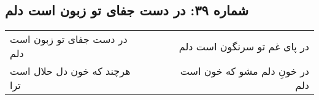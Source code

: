 \begin{center}
\section*{شماره ۳۹: در دست جفای تو زبون است دلم}
\label{sec:039}
\begin{longtable}{l p{0.5cm} r}
در دست جفای تو زبون است دلم
&&
در پای غم تو سرنگون است دلم
\\
هرچند که خون دل حلال است ترا
&&
در خونِ دلم مشو که خون است دلم
\\
\end{longtable}
\end{center}
